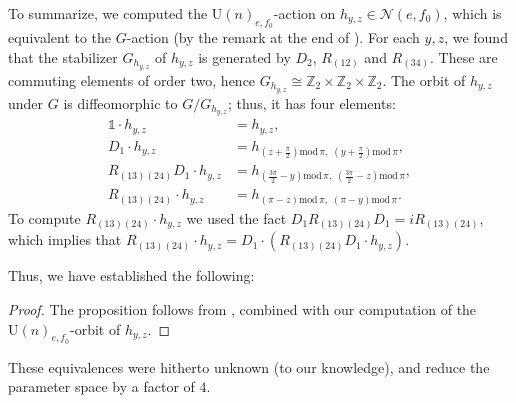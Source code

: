 \documentclass[referee,sn-mathphys-num]{sn-jnl}%
\theoremstyle{thmstyleone}%
\newtheorem{proposition}[theorem]{Proposition}%
\theoremstyle{thmstyletwo}%
\theoremstyle{remark}
\theoremstyle{thmstylethree}%
\begin{document}
To summarize, we computed the $ \mathrm{U} \left( n \right)_{e, f_0} $-action on $h_{y,z} \in \mathcal{N} \left( e, f_0 \right) $, which is equivalent to the $G$-action (by the remark at the end of ). For each $y,z$, we found that the stabilizer $G_{h_{y,z}}$ of $h_{y,z}$ is generated by $D_2$, $R_{\left( 1 2 \right)}$ and $ R_{\left( 3 4 \right)} $. These are commuting elements of order two, hence $ G_{h_{y,z}} \cong \mathbb{Z}_2 \times \mathbb{Z}_2 \times \mathbb{Z}_2 $. The orbit of $h_{y,z}$ under $G$ is diffeomorphic to $ G / G_{h_{y,z}} $; thus, it has four elements:
\begin{equation}
	\begin{split}
		\mathds{1} \cdot h_{y,z} & = h_{y,z}, \\ 
		D_1 \cdot h_{y,z} & = h_{ \left( z + \frac{\pi}{2} \right) \mathrm{mod} \, \pi, \; \left( y + \frac{\pi}{2} \right) \mathrm{mod} \, \pi }, \\
		R_{\left( 1 3 \right) \left( 2 4 \right)} D_1 \cdot h_{y,z} & = h_{ \left( \frac{3\pi}{2} -y \right) \mathrm{mod} \, \pi, \; \left( \frac{3\pi}{2} -z \right) \mathrm{mod} \, \pi }, \\ 
		R_{\left( 1 3 \right) \left( 2 4 \right)} \cdot h_{y,z} & = h_{\left( \pi-z \right) \mathrm{mod} \, \pi , \; \left( \pi-y \right) \mathrm{mod} \, \pi } .
	\end{split}
\end{equation}
To compute $ R_{\left( 1 3 \right) \left( 2 4 \right)} \cdot h_{y,z} $ we used the fact $ D_1 R_{\left( 13 \right) \left( 24 \right)} D_1 = i R_{\left( 13 \right) \left( 24 \right)} $, which implies that $ R_{\left( 1 3 \right) \left( 2 4 \right)} \cdot h_{y,z} = D_1 \cdot \left( R_{\left( 1 3 \right) \left( 2 4 \right)} D_1 \cdot h_{y,z} \right) $.

Thus, we have established the following:
\begin{proof}
	The proposition follows from , combined with our computation of the $ \mathrm{U} \left( n \right)_{e, f_0} $-orbit of $ h_{y,z} $.
\end{proof}
These equivalences were hitherto unknown (to our knowledge), and reduce the parameter space by a factor of $4$.
\end{document}
